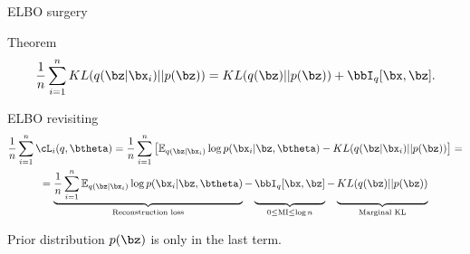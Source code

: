 

\begin{frame}
\titlepage
\end{frame}
\begin{frame}{ELBO surgery}
	\begin{block}{Theorem}
	\[
	 	\frac{1}{n} \sum_{i=1}^n KL(q(\bz | \bx_i) || p(\bz)) = KL(q(\bz) || p(\bz)) + \bbI_q [\bx, \bz].
	\]
	\end{block}
	\begin{block}{ELBO revisiting}
	\vspace{-0.4cm}
	{\footnotesize
	\begin{multline*}
	    \frac{1}{n}\sum_{i=1}^n \cL_i(q, \btheta) = \frac{1}{n} \sum_{i=1}^n \left[ \mathbb{E}_{q(\bz | \bx_i)} \log p(\bx_i | \bz, \btheta) - KL(q(\bz | \bx_i) || p(\bz)) \right] = \\
	    = \underbrace{\frac{1}{n} \sum_{i=1}^n \mathbb{E}_{q(\bz | \bx_i)} \log p(\bx_i | \bz, \btheta)}_{\text{Reconstruction loss}} - \underbrace{\vphantom{ \sum_{i=1}^n} \bbI_q [\bx, \bz]}_{0 \leq \text{MI} \leq \log n } - \underbrace{\vphantom{ \sum_{i=1}^n} KL(q(\bz) || p(\bz))}_{\text{Marginal KL}}
	\end{multline*}
	}
	\vspace{-0.2cm}
	\end{block}
	Prior distribution $p(\bz)$ is only in the last term.
\end{frame}
